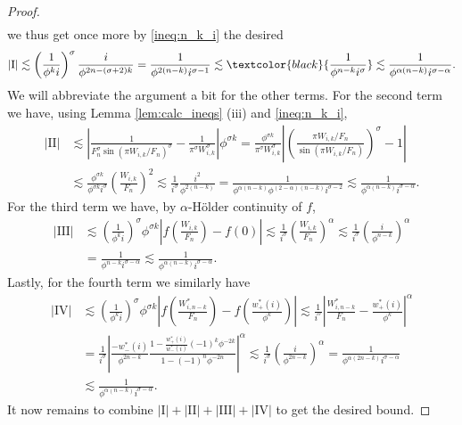 \documentclass[]{interact}
\theoremstyle{definition}
\numberwithin{table}{section} %
\numberwithin{figure}{section}
\begin{document}
\begin{proof}
\begin{align*}
    \end{align*}
    we thus get once more by \eqref{ineq:n_k_i} the desired
    $$
    |\text{I}| \lesssim \left(\frac{1}{\phi^k i}\right)^\sigma \frac{i}{\phi^{2n-(\sigma+2)k}} = \frac1{\phi^{2(n-k)} i^{\sigma-1}} \lesssim \textcolor{black}{\frac1{\phi^{n-k} i^\sigma}} \lesssim \frac1{\phi^{\alpha(n-k)} i^{\sigma-\alpha}}.
    $$
    We will abbreviate the argument a bit for the other terms. For the second term we have, using Lemma \ref{lem:calc_ineqs} (iii) and \eqref{ineq:n_k_i},
    \begin{align*}
        |\text{II}| & \lesssim \left|\frac{1}{F_n^\sigma \sin(\pi W_{i, k}/F_n)^\sigma}-\frac{1}{\pi^\sigma W_{i, k}^\sigma}\right| \phi^{\sigma k} = \frac{\phi^{\sigma k}}{\pi^\sigma W_{i, k}^\sigma} \left|\left(\frac{\pi W_{i, k}/F_n}{\sin(\pi W_{i, k}/F_n)}\right)^\sigma-1\right| \\
        & \lesssim \frac{\phi^{\sigma k}}{\phi^{\sigma k} i^\sigma} \left(\frac{W_{i, k}}{F_n}\right)^2 \lesssim \frac1{i^\sigma} \frac{i^2}{\phi^{2(n-k)}} = \frac{1}{\phi^{\alpha(n-k)} \phi^{(2-\alpha)(n-k)} i^{\sigma-2}} \lesssim \frac1{\phi^{\alpha (n-k)} i^{\sigma-\alpha}}.
    \end{align*}
    For the third term we have, by $\alpha$-Hölder continuity of $f$,
    \begin{align*}
        |\text{III}| & \lesssim \left(\frac1{\phi^k i}\right)^\sigma \phi^{\sigma k} \left|f\left(\frac{W_{i, k}}{F_n}\right)-f(0)\right| \lesssim \frac1{i^\sigma} \left(\frac{W_{i, k}}{F_n}\right)^\alpha \lesssim \frac1{i^\sigma} \left(\frac{i}{\phi^{n-k}}\right)^\alpha \\
        & = \frac1{\phi^{n-k} i^{\sigma-\alpha}} \lesssim \frac1{\phi^{\alpha(n-k)} i^{\sigma-\alpha}}.
    \end{align*}
    Lastly, for the fourth term we similarly have
    \begin{align*}
        |\text{IV}| & \lesssim \left(\frac1{\phi^k i}\right)^\sigma \phi^{\sigma k} \left|f\left(\frac{W_{i, n-k}^*}{F_n}\right) - f\left(\frac{w_+^*(i)}{\phi^k}\right)\right| \lesssim \frac1{i^\sigma} \left|\frac{W_{i, n-k}^*}{F_n} - \frac{w_+^*(i)}{\phi^k}\right|^\alpha \\
        & = \frac1{i^\sigma} \left|\frac{-w_-^*(i)}{\phi^{2n-k}} \frac{1 - \frac{w_+^*(i)}{w_-^*(i)} (-1)^{k} \phi^{-2k}}{1-(-1)^n \phi^{-2n}}\right|^\alpha \lesssim \frac1{i^\sigma} \left(\frac{i}{\phi^{2n-k}}\right)^\alpha = \frac1{\phi^{\alpha(2n-k)} i^{\sigma-\alpha}} \\
        & \lesssim \frac1{\phi^{\alpha(n-k)} i^{\sigma-\alpha}}.
    \end{align*}
    It now remains to combine $|\text{I}| + |\text{II}| + |\text{III}| + |\text{IV}|$ to get the desired bound.
\end{proof}
\end{document}
